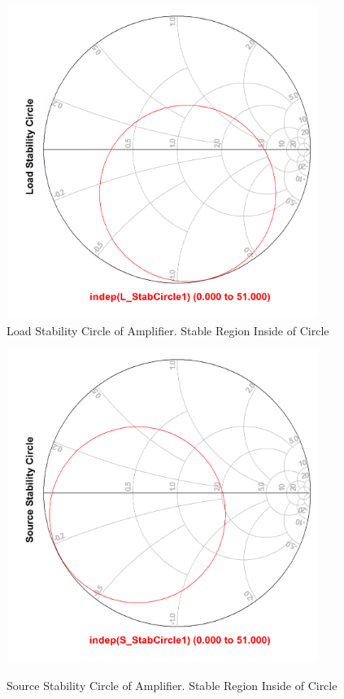 \begin{figure}
\end{figure}

\begin{figure}
  \centering
  \includegraphics[width=4in,height=4in,keepaspectratio]{figures/amp_sim/load_stab_amp}\\
  \caption{Load Stability Circle of Amplifier. Stable Region Inside of Circle}
  \label{fig:amp_sim_load_stab}

  \vspace*{\floatsep}

  \centering
  \includegraphics[width=4in,height=4in,keepaspectratio]{figures/amp_sim/source_stab_amp}\\
  \caption{Source Stability Circle of Amplifier. Stable Region Inside of Circle}
  \label{fig:amp_sim_source_stab}
\end{figure}


%
%
%

